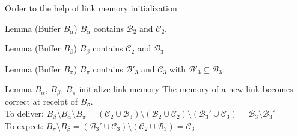 \documentclass[10pt, xcolor={usenames, dvipsnames}]{beamer}
\begin{document}
\begin{frame}{Order to the help of link memory initialization}

  \begin{center}
    
  \end{center}

  \vspace{-1em}

  \begin{minipage}{0.325\textwidth}
    \begin{block}{Lemma (Buffer $B_\alpha$)}
      $B_\alpha$ contains $\mathcal{B}_2$ and $\mathcal{C}_2$.
    \end{block}
  \end{minipage}
  \begin{minipage}{0.325\textwidth}
    \begin{block}{Lemma (Buffer $B_\beta$)}
      $B_\beta$ contains $\mathcal{C}_2$ and $\mathcal{B}_3$.
    \end{block}
  \end{minipage}
  \begin{minipage}{0.325\textwidth}
    \begin{block}{Lemma (Buffer $B_\pi$)}
      $B_\pi$ contains $\mathcal{B'}_3$ and $\mathcal{C}_3$ with 
      $\mathcal{B}'_3 \subseteq \mathcal{B}_3$.
    \end{block}
  \end{minipage}
  
  \begin{block}{Lemma $B_\alpha$, $B_\beta$, $B_\pi$ initialize link memory}
    The memory of a new link becomes correct at receipt of $B_\beta$. \\
    To deliver:
    $B_\beta \setminus B_\alpha \setminus B_\pi = (\mathcal{C}_2 \cup
    \mathcal{B}_3) \setminus (\mathcal{B}_2 \cup \mathcal{C}_2) \setminus
    (\mathcal{B}_3' \cup \mathcal{C}_3) = \mathcal{B}_3 \setminus
    \mathcal{B}_3'$\\
    To expect:
    $B_\pi \setminus B_\beta = (\mathcal{B}_3' \cup \mathcal{C}_3) \setminus
    (\mathcal{C}_2 \cup \mathcal{B}_3) = \mathcal{C}_3$

  \end{block}   
    
\end{frame}
\end{document}

